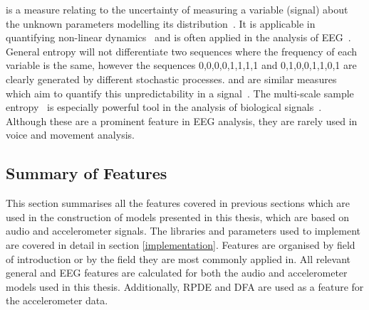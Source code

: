 \documentclass[12pt, twoside]{book}
\renewcommand\emph[1]{\textit{\color{USred}{#1}}}
\begin{document}
\emph{Fisher Information} is a measure relating to the uncertainty of measuring a variable (signal) about the unknown parameters modelling its distribution~\cite{fisherentropy}. It is applicable in quantifying non-linear dynamics~\cite{fisherinfo} and is often applied in the analysis of EEG~\cite{martin1999fisherinfoeeg}. General entropy will not differentiate two sequences where the frequency of each variable is the same, however the sequences 0,0,0,0,1,1,1,1 and 0,1,0,0,1,1,0,1 are clearly generated by different stochastic processes. \emph{Approximate} and \emph{sample entropy} are similar measures which aim to quantify this unpredictability in a signal~\cite{apsampentropy, apentropy}. The multi-scale sample entropy~\cite{multiscaleentropy} is especially powerful tool in the analysis of biological signals~\cite{samplegaitmulti, sampleheart}. Although these are a prominent feature in EEG analysis, they are rarely used in voice and movement analysis. 


\subsection{Summary of Features}
This section summarises all the features covered in previous sections which are used in the construction of models presented in this thesis, which are based on audio and accelerometer signals. The libraries and parameters used to implement are covered in detail in section \ref{implementation}. Features are organised by field of introduction or by the field they are most commonly applied in. All relevant general and EEG features are calculated for both the audio and accelerometer models used in this thesis. Additionally, RPDE and DFA are used as a feature for the accelerometer data.
\end{document}
